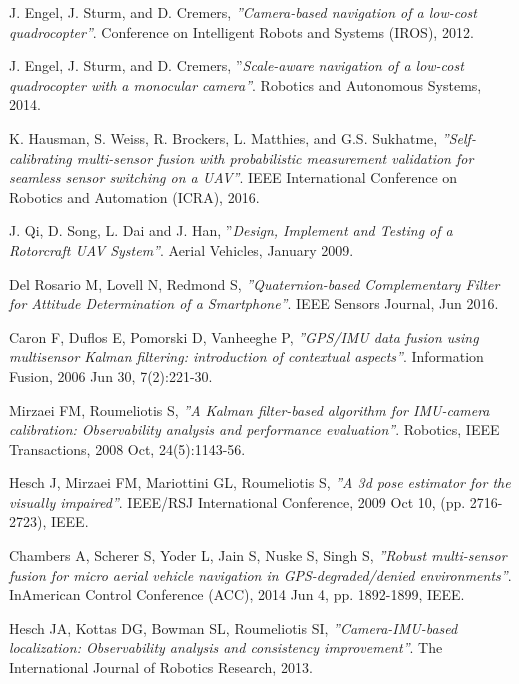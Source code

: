 \documentclass[a4paper,10pt]{article}
\begin{document}
\begin{thebibliography}{9}
    J. Engel, J. Sturm, and D. Cremers,
    \textit{''Camera-based navigation of a low-cost quadrocopter''}.
    Conference on Intelligent Robots and Systems (IROS),
    2012.
    
    J. Engel, J. Sturm, and D. Cremers,
    ''\textit{Scale-aware navigation of a low-cost quadrocopter with a monocular camera''}.
    Robotics and Autonomous Systems, 
    2014.

    K. Hausman, S. Weiss, R. Brockers, L. Matthies, and G.S. Sukhatme,
    \textit{''Self-calibrating multi-sensor fusion with probabilistic measurement validation for seamless sensor switching on a UAV''}.
    IEEE International Conference on Robotics and Automation (ICRA),
    2016.

    J. Qi, D. Song, L. Dai and J. Han,
    ''\textit{Design, Implement and Testing of a Rotorcraft UAV System''}.
    Aerial Vehicles, 
    January 2009.

    Del Rosario M, Lovell N, Redmond S,
    \textit{''Quaternion-based Complementary Filter for Attitude Determination of a Smartphone''}.
    IEEE Sensors Journal,
    Jun 2016.

    Caron F, Duflos E, Pomorski D, Vanheeghe P,
    \textit{''GPS/IMU data fusion using multisensor Kalman filtering: introduction of contextual aspects''}.
    Information Fusion,
    2006 Jun 30,
    7(2):221-30.
    
    Mirzaei FM, Roumeliotis S,
    \textit{''A Kalman filter-based algorithm for IMU-camera calibration: Observability analysis and performance evaluation''}.
    Robotics, IEEE Transactions,
    2008 Oct,
    24(5):1143-56.

    Hesch J, Mirzaei FM, Mariottini GL, Roumeliotis S,
    \textit{''A 3d pose estimator for the visually impaired''}.
    IEEE/RSJ International Conference,
    2009 Oct 10,
    (pp. 2716-2723),
    IEEE.
    
    Chambers A, Scherer S, Yoder L, Jain S, Nuske S, Singh S,
    \textit{''Robust multi-sensor fusion for micro aerial vehicle navigation in GPS-degraded/denied environments''}.
    InAmerican Control Conference (ACC),
    2014 Jun 4, 
    pp. 1892-1899, IEEE.

    Hesch JA, Kottas DG, Bowman SL, Roumeliotis SI,
    \textit{''Camera-IMU-based localization: Observability analysis and consistency improvement''}.
    The International Journal of Robotics Research,
    2013.


\end{thebibliography}
\end{document}
